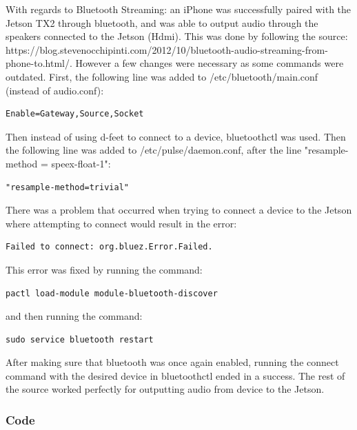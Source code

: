 \documentclass[onecolumn, draftclsnofoot,10pt, compsoc]{IEEEtran}
\begin{document}
With regards to Bluetooth Streaming: an iPhone was successfully paired with the Jetson TX2 through bluetooth, and was able to output audio through the speakers connected to the Jetson (Hdmi). This was done by following the source: https://blog.stevenocchipinti.com/2012/10/bluetooth-audio-streaming-from-phone-to.html/. However a few changes were necessary as some commands were outdated. First, the following line was added to /etc/bluetooth/main.conf (instead of audio.conf):\par
\begin{verbatim}
Enable=Gateway,Source,Socket
\end{verbatim}
Then instead of using d-feet to connect to a device, bluetoothctl was used. Then the following line was added to /etc/pulse/daemon.conf, after the line "resample-method = speex-float-1":\par
\begin{verbatim}
"resample-method=trivial"
\end{verbatim}
There was a problem that occurred when trying to connect a device to the Jetson where attempting to connect would result in the error: 
\begin{verbatim}
Failed to connect: org.bluez.Error.Failed.
\end{verbatim} This error was fixed by running the command:
\begin{verbatim}
pactl load-module module-bluetooth-discover
\end{verbatim} and then running the command:
\begin{verbatim}
sudo service bluetooth restart
\end{verbatim}
After making sure that bluetooth was once again enabled, running the connect command with the desired device in bluetoothctl ended in a success. The rest of the source worked perfectly for outputting audio from device to the Jetson.\par

\subsubsection{Code}
\end{document}
